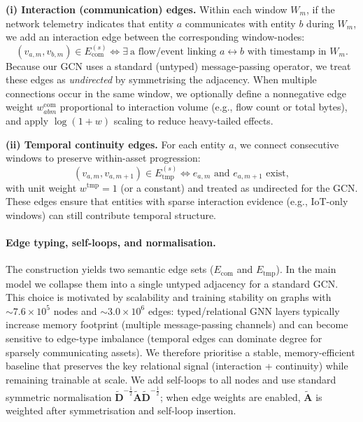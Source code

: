 \documentclass[pdflatex,sn-mathphys-num]{sn-jnl}
\theoremstyle{thmstyleone}%
\theoremstyle{thmstyletwo}%
\theoremstyle{thmstylethree}%
\begin{document}
\textbf{(i) Interaction (communication) edges.}
Within each window $W_m$, if the network telemetry indicates that entity $a$ communicates with entity $b$ during $W_m$,
we add an interaction edge between the corresponding window-nodes:
\begin{equation}
(v_{a,m},v_{b,m})\in E^{(s)}_{\mathrm{com}}
\iff \exists\ \text{a flow/event linking }a\leftrightarrow b \text{ with timestamp in }W_m.
\end{equation}
Because our GCN uses a standard (untyped) message-passing operator, we treat these edges as \emph{undirected} by symmetrising the adjacency.
When multiple connections occur in the same window, we optionally define a nonnegative edge weight
$w^{\mathrm{com}}_{abm}$ proportional to interaction volume (e.g., flow count or total bytes),
and apply $\log(1+w)$ scaling to reduce heavy-tailed effects.

\textbf{(ii) Temporal continuity edges.}
For each entity $a$, we connect consecutive windows to preserve within-asset progression:
\begin{equation}
(v_{a,m},v_{a,m+1})\in E^{(s)}_{\mathrm{tmp}}
\iff e_{a,m}\text{ and }e_{a,m+1}\text{ exist},
\end{equation}
with unit weight $w^{\mathrm{tmp}}=1$ (or a constant) and treated as undirected for the GCN.
These edges ensure that entities with sparse interaction evidence (e.g., IoT-only windows) can still contribute temporal structure.

\paragraph{Edge typing, self-loops, and normalisation.}
The construction yields two semantic edge sets ($E_{\mathrm{com}}$ and $E_{\mathrm{tmp}}$). In the main model we collapse them into a single untyped adjacency for a standard GCN. This choice is motivated by scalability and training stability on graphs with $\sim 7.6\times 10^5$ nodes and $\sim 3.0\times 10^6$ edges: typed/relational GNN layers typically increase memory footprint (multiple message-passing channels) and can become sensitive to edge-type imbalance (temporal edges can dominate degree for sparsely communicating assets). We therefore prioritise a stable, memory-efficient baseline that preserves the key relational signal (interaction + continuity) while remaining trainable at scale. We add self-loops to all nodes and use standard symmetric normalisation $\tilde{\mathbf{D}}^{-\frac{1}{2}}\tilde{\mathbf{A}}\tilde{\mathbf{D}}^{-\frac{1}{2}}$; when edge weights are enabled, $\tilde{\mathbf{A}}$ is weighted after symmetrisation and self-loop insertion.
\end{document}

